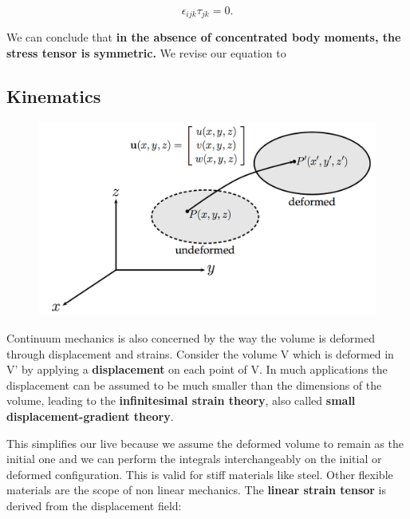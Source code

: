 			 \begin{equation}
			 \epsilon _{ijk} \tau _{jk}= 0.
			 \end{equation}
			 
			 We can conclude that \textbf{in the absence of concentrated body moments, the stress tensor is symmetric.} We revise our equation to
			 
			 \begin{center}
			 \end{center}
			 
		\subsection{Kinematics}
			\begin{figure}
			\vspace{-5mm}	
			\includegraphics[scale=0.3]{ch3/5}
			\end{figure}		
			Continuum mechanics is also concerned by the way the volume is deformed through displacement and strains. Consider the volume V which is deformed in V' by applying a \textbf{displacement} on each point of V. In much applications the displacement can be assumed to be much smaller than the dimensions of the volume, leading to the \textbf{infinitesimal strain theory}, also called \textbf{small displacement-gradient theory}. \newpage 
			
			This simplifies our live because we assume the deformed volume to remain as the initial one and we can perform the integrals interchangeably on the initial or deformed configuration. This is valid for stiff materials like steel. Other flexible materials are the scope of non linear mechanics. The \textbf{linear strain tensor} is derived from the displacement field:
			
